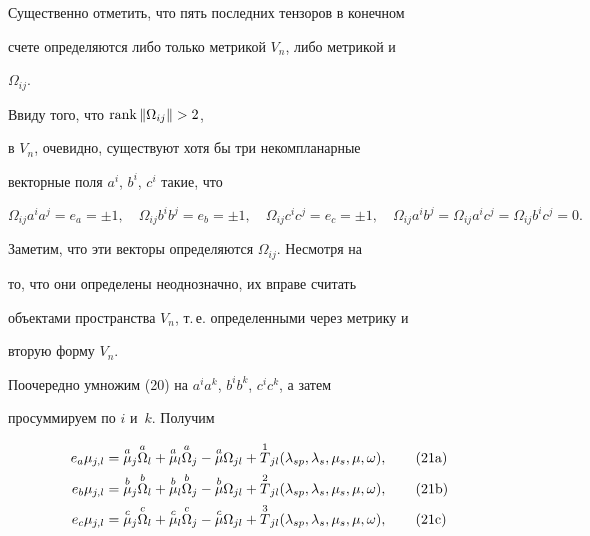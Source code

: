 Существенно отметить, что пять последних тензоров в конечном


счете определяются либо только метрикой $V_n$, либо метрикой и 


$\Omega_{ij}$.








Ввиду того, что $\rank\|\Omega_{ij}\|>2$,


в $V_n$, очевидно, существуют хотя бы три некомпланарные


векторные поля $a^i$, $b^i$, $c^i$ такие, что


$$


\Omega_{ij}a^ia^j=e_a=\pm 1,\quad 


\Omega_{ij}b^ib^j=e_b=\pm 1,\quad


\Omega_{ij}c^ic^j=e_c=\pm 1,\quad


\Omega_{ij}a^ib^j=\Omega_{ij}a^ic^j=\Omega_{ij}b^ic^j=0.


$$


Заметим, что эти векторы определяются $\Omega_{ij}$. Несмотря на


то, что они определены неоднозначно, их вправе считать


объектами пространства $V_n$, т.\,е. определенными через метрику и


вторую форму $V_n$.





Поочередно умножим (20) на $a^ia^k$, $b^ib^k$, $c^ic^k$, а затем


просуммируем по $i$ и~$k$. Получим


\begin{align}


e_a\mu_{j,l}&=\up{a}{\mu}_j\up{a}{\Omega}_l+\up{a}{\mu}_l\up{a}{\Omega}_j-


\up{a}{\mu}\Omega_{jl}+ 


\up{1}{T}_{jl}(\lambda_{sp},\lambda_s,\mu_s,\mu ,\omega),\tag{21\text{a}}\\


%


e_b\mu_{j,l}&=\up{b}{\mu}_j\up{b}{\Omega}_l+\up{b}{\mu}_l\up{b}{\Omega}_j-


\up{b}{\mu}\Omega_{jl}+ 


\up{2}{T}_{jl}(\lambda_{sp},\lambda_s,\mu_s,\mu ,\omega),\tag{21\text{b}}\\


%


e_c\mu_{j,l}&=\up{c}{\mu}_j\up{c}{\Omega}_l+\up{c}{\mu}_l\up{c}{\Omega}_j-


\up{c}{\mu}\Omega_{jl}+ 


\up{3}{T}_{jl}(\lambda_{sp},\lambda_s,\mu_s,\mu ,\omega ),\tag{21\text{c}}


\end{align}


